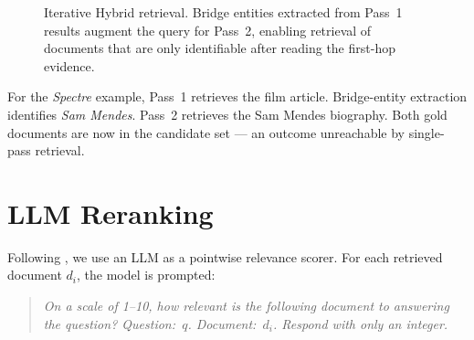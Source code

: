 \documentclass{article}
\begin{document}
\begin{figure}[h]
\centering
{}
\caption{Iterative Hybrid retrieval.  Bridge entities extracted from
Pass~1 results augment the query for Pass~2, enabling retrieval of
documents that are only identifiable after reading the first-hop evidence.}
\label{fig:iterative}
\end{figure}

For the \emph{Spectre} example, Pass~1 retrieves the film article.
Bridge-entity extraction identifies \emph{Sam Mendes}.  Pass~2 retrieves
the Sam Mendes biography.  Both gold documents are now in the candidate
set — an outcome unreachable by single-pass retrieval.

\section{LLM Reranking}
\label{sec:reranking}

Following \citet{yu2024rankrag}, we use an LLM as a pointwise
relevance scorer.  For each retrieved document $d_i$, the model is
prompted:

\begin{quote}\small
  \textit{On a scale of 1–10, how relevant is the following document
  to answering the question?  Question:~$q$.  Document:~$d_i$.  Respond
  with only an integer.}
\end{quote}
\end{document}
